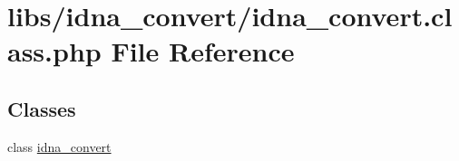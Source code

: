 \hypertarget{idna__convert_8class_8php}{}\section{libs/idna\+\_\+convert/idna\+\_\+convert.class.\+php File Reference}
\label{idna__convert_8class_8php}
\subsection*{Classes}
\begin{DoxyCompactItemize}
\item 
class \hyperlink{classidna__convert}{idna\+\_\+convert}
\end{DoxyCompactItemize}
